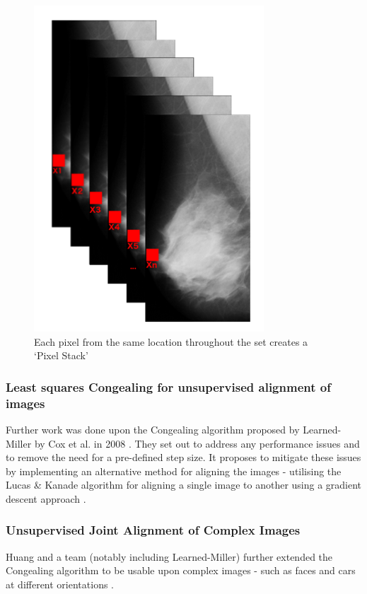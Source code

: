 \begin{figure}[H]
  \center
  \includegraphics[scale=0.5]{Chapter1/lit-review-img/pixels.png}
  \caption{Each pixel from the same location throughout the set creates a `Pixel Stack'}
  \label{fig:pixel-stack}
\end{figure}

\subsubsection{Least squares Congealing for unsupervised alignment of images}

Further work was done upon the \Gls{Congealing} algorithm proposed by Learned-Miller by Cox et al. in 2008 \cite{Cox_Sridharan_Lucey_Cohn_2008}. They set out to address any performance issues and to remove the need for a pre-defined step size. It proposes to mitigate these issues by implementing an alternative method for aligning the images - utilising the Lucas \& Kanade algorithm for aligning a single image to another using a gradient descent approach \cite{Lucas_Kanade_1981}.

\subsubsection{Unsupervised Joint Alignment of Complex Images}

Huang and a team (notably including Learned-Miller) further extended the \Gls{Congealing} algorithm to be usable upon complex images - such as faces and cars at different orientations \cite{Huang_Jain_Learned-Miller_2007}.


